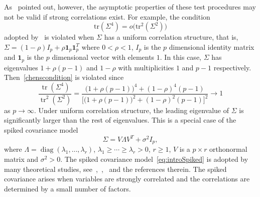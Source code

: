 \documentclass[review]{elsarticle}
\DeclareMathOperator{\mytr}{tr}
\DeclareMathOperator{\mydiag}{diag}
\theoremstyle{plain}
\theoremstyle{definition}
\theoremstyle{remark}
\begin{document}
As~\cite{Ma2015A} pointed out, however, the asymptotic properties of these test procedures may not be valid if strong correlations exist. For example, the condition 
\begin{equation}\label{chenscondition}
    \mathrm{tr}(\Sigma^4)=o\big(\mathrm{tr}^2(\Sigma^2)\big)
\end{equation}
adopted by~\cite{Chen2010A} is violated when $\Sigma$ has a uniform correlation structure, that is, $\Sigma=(1-\rho)I_p+\rho\textbf{1}_p \textbf{1}_p^T$ where $0<\rho<1$, $I_p$ is the $p$ dimensional identity matrix and $\bm{1}_p$ is the $p$ dimensional vector  with elements $1$.
In this case, $\Sigma$ has eigenvalues $1+\rho(p-1) $ and $1-\rho$ with multiplicities $1$ and $p-1$ respectively. Then~\eqref{chenscondition} is violated since 
$$
\frac{\mytr (\Sigma^4)}{\mytr^2(\Sigma^2)}=\frac{\big(1+\rho(p-1)\big)^4 + (1-\rho)^4 (p-1)}{\big[ \big(1+\rho(p-1)\big)^2+(1-\rho)^2 (p-1) \big]^2}\to 1
$$
as $p\to \infty$.
  Under uniform correlation structure, the leading eigenvalue of $\Sigma$ is significantly larger than the rest of eigenvalues.
  This is a special case of the spiked covariance model
 \begin{equation}\label{eq:introSpiked}
 \Sigma =V\Lambda V^T +\sigma^2 I_p,
 \end{equation}
 where $\Lambda=\mydiag(\lambda_1,\ldots,\lambda_r)$, $\lambda_1\geq \cdots\geq \lambda_r>0$, $r\geq 1$, $V$ is a $p\times r$ orthonormal matrix and $\sigma^2>0$.
The spiked covariance model~\eqref{eq:introSpiked} is adopted by many theoretical studies, see~\cite{Cai2012Sparse},~\cite{Birnbaum2013},~\cite{Passemier2015} and the references therein.
The spiked covariance arises when variables are strongly correlated and the correlations are determined by a small number of factors.
\end{document}
